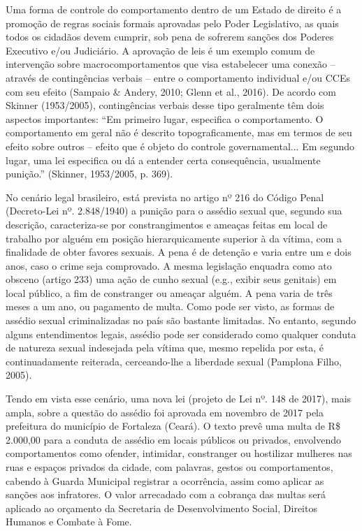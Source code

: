 Uma forma de controle do comportamento dentro de um Estado de direito é a promoção de regras sociais formais aprovadas pelo Poder Legislativo, as quais todos os cidadãos devem cumprir, sob pena de sofrerem sanções dos Poderes Executivo e/ou Judiciário. A aprovação de leis é um exemplo comum de intervenção sobre macrocomportamentos que visa estabelecer uma conexão – através de contingências verbais – entre o comportamento individual e/ou CCEs com seu efeito (Sampaio \& Andery, 2010; Glenn et al., 2016). De acordo com Skinner (1953/2005), contingências verbais desse tipo geralmente têm dois aspectos importantes: “Em primeiro lugar, especifica o comportamento. O comportamento em geral não é descrito topograficamente, mas em termos de seu efeito sobre outros – efeito que é objeto do controle governamental... Em segundo lugar, uma lei especifica ou dá a entender certa consequência, usualmente punição.” (Skinner, 1953/2005, p. 369).

No cenário legal brasileiro, está prevista no artigo nº 216 do Código Penal (Decreto-Lei nº. 2.848/1940) a punição para o assédio sexual que, segundo sua descrição, caracteriza-se por constrangimentos e ameaças feitas em local de trabalho por alguém em posição hierarquicamente superior à da vítima, com a finalidade de obter favores sexuais. A pena é de detenção e varia entre um e dois anos, caso o crime seja comprovado. A mesma legislação enquadra como ato obsceno (artigo 233) uma ação de cunho sexual (e.g., exibir seus genitais) em local público, a fim de constranger ou ameaçar alguém. A pena varia de três meses a um ano, ou pagamento de multa. Como pode ser visto, as formas de assédio sexual criminalizadas no país são bastante limitadas. No entanto, segundo alguns entendimentos legais, assédio pode ser considerado como qualquer conduta de natureza sexual indesejada pela vítima que, mesmo repelida por esta, é continuadamente reiterada, cerceando-lhe a liberdade sexual (Pamplona Filho, 2005).

Tendo em vista esse cenário, uma nova lei (projeto de Lei nº. 148 de 2017), mais ampla, sobre a questão do assédio foi aprovada em novembro de 2017 pela prefeitura do município de Fortaleza (Ceará). O texto prevê uma multa de R\$ 2.000,00 para a conduta de assédio em locais públicos ou privados, envolvendo comportamentos como ofender, intimidar, constranger ou hostilizar mulheres nas ruas e espaços privados da cidade, com palavras, gestos ou comportamentos, cabendo à Guarda Municipal registrar a ocorrência, assim como aplicar as sanções aos infratores. O valor arrecadado com a cobrança das multas será aplicado ao orçamento da Secretaria de Desenvolvimento Social, Direitos Humanos e Combate à Fome.

